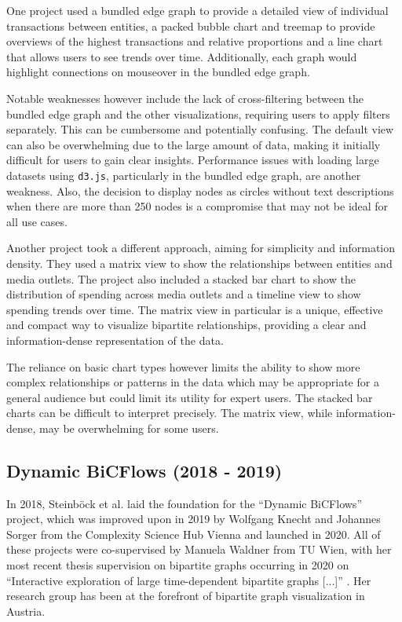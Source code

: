 \documentclass{vgtc}
\begin{document}
\medskip

One project \cite{univie03} used a bundled edge graph to provide a detailed view of individual transactions between entities, a packed bubble chart and treemap to provide overviews of the highest transactions and relative proportions and a line chart that allows users to see trends over time. Additionally, each graph would highlight connections on mouseover in the bundled edge graph.

Notable weaknesses however include the lack of cross-filtering between the bundled edge graph and the other visualizations, requiring users to apply filters separately. This can be cumbersome and potentially confusing. The default view can also be overwhelming due to the large amount of data, making it initially difficult for users to gain clear insights. Performance issues with loading large datasets using \texttt{d3.js}, particularly in the bundled edge graph, are another weakness. Also, the decision to display nodes as circles without text descriptions when there are more than 250 nodes is a compromise that may not be ideal for all use cases.

\medskip

Another project \cite{univie07} took a different approach, aiming for simplicity and information density. 
They used a matrix view to show the relationships between entities and media outlets. The project also included a stacked bar chart to show the distribution of spending across media outlets and a timeline view to show spending trends over time. The matrix view in particular is a unique, effective and compact way to visualize bipartite relationships, providing a clear and information-dense representation of the data.

The reliance on basic chart types however limits the ability to show more complex relationships or patterns in the data which may be appropriate for a general audience but could limit its utility for expert users. The stacked bar charts can be difficult to interpret precisely. The matrix view, while information-dense, may be overwhelming for some users.

\subsection{Dynamic BiCFlows (2018 - 2019)}

In 2018, Steinböck et al. \cite{Steinbck2018CasualVE} laid the foundation for the ``Dynamic BiCFlows'' project, which was improved upon in 2019 by Wolfgang Knecht and Johannes Sorger from the Complexity Science Hub Vienna \cite{sorger2019immersive} and launched in 2020. All of these projects were co-supervised by Manuela Waldner from TU Wien, with her most recent thesis supervision on bipartite graphs occurring in 2020 on ``Interactive exploration of large time-dependent bipartite graphs [...]'' \cite{unger2020interactive}. Her research group has been at the forefront of bipartite graph visualization in Austria.
\end{document}

